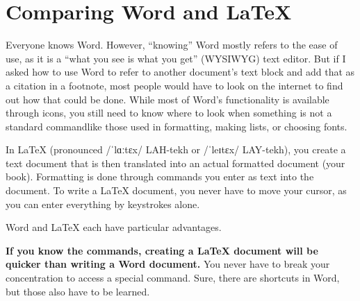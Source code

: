 

\section{Comparing Word and LaTeX}\label{differencebetweenwordandlatex:sec}


Everyone knows Word. However, ``knowing'' Word mostly refers to the ease of use, as it is a ``what you see is what you get'' (WYSIWYG) text editor. But if I asked how to use Word to refer to another document's text block and add that as a citation in a footnote, most people would have to look on the internet to find out how that could be done. While most of Word's functionality is available through icons, you still need to know where to look when something is not a standard command\emdash{}like those used in formatting, making lists, or choosing fonts.



In LaTeX (pronounced \ifxetex/ˈlɑːtɛx/\fi{} LAH-tekh or \ifxetex/ˈleɪtɛx/\fi{} LAY-tekh), you create a text document that is then translated into an actual formatted document (your book). Formatting is done through commands you enter as text into the document. To write a LaTeX document, you never have to move your cursor, as you can enter everything by keystrokes alone.



Word and LaTeX each have particular advantages.

\textbf{If you know the commands, creating a LaTeX document will be quicker than writing a Word document.} You never have to break your concentration to access a special command. Sure, there are shortcuts in Word, but those also have to be learned.

